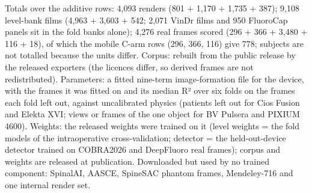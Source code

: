 \begin{table}[p]
{\begin{minipage}{23.2cm}
Totals over the additive rows: 4,093 renders (801 + 1,170 + 1,735 + 387); 9,108 level-bank films (4,963 + 3,603 + 542; 2,071 VinDr films and 950 FluoroCap panels sit in the fold banks alone); 4,276 real frames scored (296 + 366 + 3,480 + 116 + 18), of which the mobile C-arm rows (296, 366, 116) give 778; subjects are not totalled because the units differ.
Corpus: rebuilt from the public release by the released exporters (the licences differ, so derived frames are not redistributed). Parameters: a fitted nine-term image-formation file for the device, with the frames it was fitted on and its median R² over six folds on the frames each fold left out, against uncalibrated physics (patients left out for Cios Fusion and Elekta XVI; views or frames of the one object for BV Pulsera and PIXIUM 4600). Weights: the released weights were trained on it (level weights = the fold models of the intraoperative cross-validation; detector = the held-out-device detector trained on COBRA2026 and DeepFluoro real frames); corpus and weights are released at publication. Downloaded but used by no trained component: SpinalAI, AASCE, SpineSAC phantom frames, Mendeley-716 and one internal render set.
\par\endgroup
\end{minipage}}
\endgroup
\end{table}
